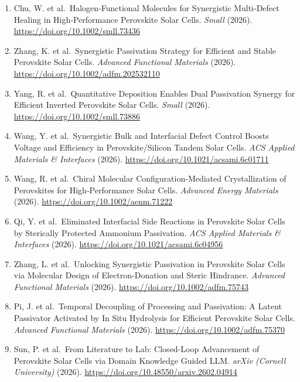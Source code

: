 \documentclass[
  11pt,
]{article}
\begin{document}
\begin{enumerate}
  Pan, W. et al.~Defect-Anchored Dipole Molecules Induce Surface
  Polarization Facilitating High-Performance Inverted Perovskite Solar
  Cells. \emph{Nano-Micro Letters} (2026).
  \url{https://doi.org/10.1007/s40820-026-02150-7}
\item
  Chu, W. et al.~Halogen‐Functional Molecules for Synergistic
  Multi‐Defect Healing in High‐Performance Perovskite Solar Cells.
  \emph{Small} (2026). \url{https://doi.org/10.1002/smll.73436}
\item
  Zhang, K. et al.~Synergistic Passivation Strategy for Efficient and
  Stable Perovskite Solar Cells. \emph{Advanced Functional Materials}
  (2026). \url{https://doi.org/10.1002/adfm.202532110}
\item
  Yang, R. et al.~Quantitative Deposition Enables Dual Passivation
  Synergy for Efficient Inverted Perovskite Solar Cells. \emph{Small}
  (2026). \url{https://doi.org/10.1002/smll.73886}
\item
  Wang, Y. et al.~Synergistic Bulk and Interfacial Defect Control Boosts
  Voltage and Efficiency in Perovskite/Silicon Tandem Solar Cells.
  \emph{ACS Applied Materials \& Interfaces} (2026).
  \url{https://doi.org/10.1021/acsami.6c01711}
\item
  Wang, R. et al.~Chiral Molecular Configuration‐Mediated
  Crystallization of Perovskites for High‐Performance Solar Cells.
  \emph{Advanced Energy Materials} (2026).
  \url{https://doi.org/10.1002/aenm.71222}
\item
  Qi, Y. et al.~Eliminated Interfacial Side Reactions in Perovskite
  Solar Cells by Sterically Protected Ammonium Passivation. \emph{ACS
  Applied Materials \& Interfaces} (2026).
  \url{https://doi.org/10.1021/acsami.6c04956}
\item
  Zhang, L. et al.~Unlocking Synergistic Passivation in Perovskite Solar
  Cells via Molecular Design of Electron‐Donation and Steric Hindrance.
  \emph{Advanced Functional Materials} (2026).
  \url{https://doi.org/10.1002/adfm.75743}
\item
  Pi, J. et al.~Temporal Decoupling of Processing and Passivation: A
  Latent Passivator Activated by In Situ Hydrolysis for Efficient
  Perovskite Solar Cells. \emph{Advanced Functional Materials} (2026).
  \url{https://doi.org/10.1002/adfm.75370}
\item
  Sun, P. et al.~From Literature to Lab: Closed-Loop Advancement of
  Perovskite Solar Cells via Domain Knowledge Guided LLM. \emph{arXiv
  (Cornell University)} (2026).
  \url{https://doi.org/10.48550/arxiv.2602.04914}

\end{enumerate}
\end{document}
